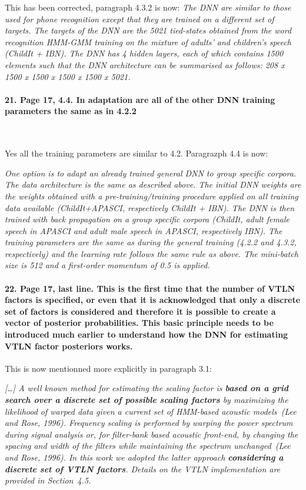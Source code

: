 \documentclass[]{article}
\begin{document}
This has been corrected, paragraph 4.3.2 is now:
\textit{The DNN  are similar to those  used for phone  recognition except that they are  trained on a different  set of targets. The  targets of the DNN are the 5021 tied-states obtained from the word recognition HMM-GMM training on the mixture of adults' and children's  speech (ChildIt + IBN). The DNN has 4 hidden  layers, each of which  contains 1500 elements  such that the DNN architecture  can be summarised  as follows: 208  x 1500 x  1500 x 1500 x 1500 x 5021.}

\paragraph{21. Page 17, 4.4. In adaptation are all of the other DNN training parameters the same as in 4.2.2}

~

Yes all the training parameters are similar to 4.2. Paragrazph 4.4 is now:

\textit{One option is to adapt an already trained general DNN  to group specific corpora. The data architecture is the same as described above. The initial DNN weights are the weights obtained with a pre-training/training procedure applied on all training data available  (ChildIt+APASCI, respectively ChildIt + IBN). The DNN is then trained with back propagation on a group specific corpora (ChildIt, adult female speech in APASCI and adult male speech in APASCI, respectively IBN). The training parameters are the same as during the general training (4.2.2 and 4.3.2, respectively) and the learning rate follows the same rule as above. The mini-batch size is 512 and a first-order momentum of 0.5 is applied.}

\paragraph{22. Page 17, last line. This is the first time that the number of VTLN factors is specified, or even that it is acknowledged that only a discrete set of factors is considered and therefore it is possible to create a vector of posterior probabilities. This basic principle needs to be introduced much earlier to understand how the DNN for estimating VTLN factor posteriors works.}

This is now mentionned more explicitly in paragraph 3.1: 

\textit{[\dots] A  well  known  method  for estimating  the scaling  factor is \textbf{ based on  a  grid search  over a  discrete set  of possible scaling  factors} by maximizing the likelihood  of warped data given  a  current set  of  HMM-based acoustic  models~(Lee and Rose, 1996). Frequency scaling  is performed by  warping the power  spectrum during signal  analysis  or, for  filter-bank  based  acoustic front-end,  by changing the  spacing and width  of the filters while  maintaining the spectrum  unchanged~(Lee and Rose, 1996). In  this  work we  adopted  the latter approach \textbf{considering a discrete set of VTLN factors}. Details on the VTLN implementation  are provided in Section~4.5.}
\end{document}
